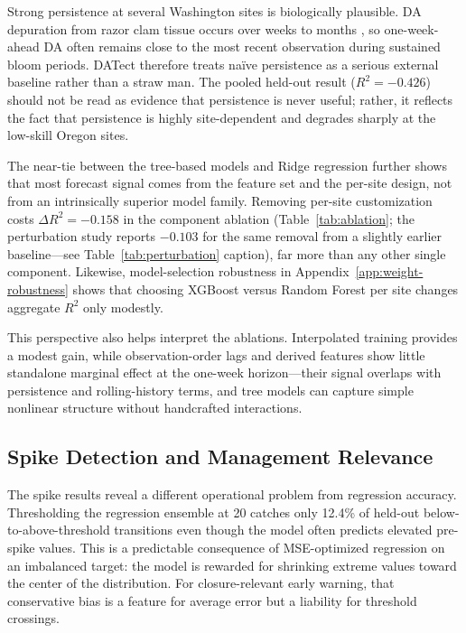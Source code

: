 \documentclass[toxins,article,submit,moreauthors]{Definitions/mdpi}
\begin{document}
Strong persistence at several Washington sites is biologically plausible. DA depuration from razor clam tissue occurs over weeks to months \cite{Drum1993, Wekell1994}, so one-week-ahead DA often remains close to the most recent observation during sustained bloom periods. DATect therefore treats na\"ive persistence as a serious external baseline rather than a straw man. The pooled held-out result ($R^2 = -0.426$) should not be read as evidence that persistence is never useful; rather, it reflects the fact that persistence is highly site-dependent and degrades sharply at the low-skill Oregon sites.

The near-tie between the tree-based models and Ridge regression further shows that most forecast signal comes from the feature set and the per-site design, not from an intrinsically superior model family. Removing per-site customization costs $\Delta R^2 = -0.158$ in the component ablation (Table~\ref{tab:ablation}; the perturbation study reports $-0.103$ for the same removal from a slightly earlier baseline---see Table~\ref{tab:perturbation} caption), far more than any other single component. Likewise, model-selection robustness in Appendix~\ref{app:weight-robustness} shows that choosing XGBoost versus Random Forest per site changes aggregate $R^2$ only modestly.

This perspective also helps interpret the ablations. Interpolated training provides a modest gain, while observation-order lags and derived features show little standalone marginal effect at the one-week horizon---their signal overlaps with persistence and rolling-history terms, and tree models can capture simple nonlinear structure without handcrafted interactions.

\subsection{Spike Detection and Management Relevance}
\label{sec:discussion-spike}

The spike results reveal a different operational problem from regression accuracy. Thresholding the regression ensemble at \SI{20}{\microgrampeg} catches only 12.4\% of held-out below-to-above-threshold transitions even though the model often predicts elevated pre-spike values. This is a predictable consequence of MSE-optimized regression on an imbalanced target: the model is rewarded for shrinking extreme values toward the center of the distribution. For closure-relevant early warning, that conservative bias is a feature for average error but a liability for threshold crossings.
\end{document}
